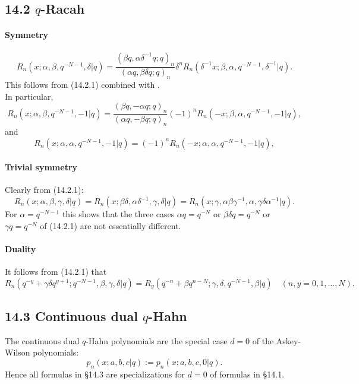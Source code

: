 \documentclass[twoside,11pt]{article}
\newcommand\sa{\smallskipamount}
\newcommand\sLP{\\[\sa]}
\newcommand\al\alpha
\newcommand\be\beta
\newcommand\ga\gamma
\newcommand\de\delta
\begin{document}
\subsection*{14.2 $q$-Racah}
\label{sec14.2}
\paragraph{Symmetry}
\begin{equation}
R_n(x;\al,\be,q^{-N-1},\de |  q)
=\frac{(\be q,\al\de^{-1}q;q)_n}{(\al q,\be\de q;q)_n} \de^n 
R_n(\de^{-1}x;\be,\al,q^{-N-1},\de^{-1} |  q).
\label{84}
\end{equation}
This follows from (14.2.1) combined with .
\sLP
In particular,
\begin{equation}
R_n(x;\al,\be,q^{-N-1},-1 |  q)
=\frac{(\be q,-\al q;q)_n}{(\al q,-\be q;q)_n} (-1)^n 
R_n(-x;\be,\al,q^{-N-1},-1 |  q),
\label{85}
\end{equation}
and
\begin{equation}
R_n(x;\al,\al,q^{-N-1},-1 |  q)
=(-1)^n R_n(-x;\al,\al,q^{-N-1},-1 |  q),
\label{86}
\end{equation}

\paragraph{Trivial symmetry}
Clearly from (14.2.1):
\begin{equation}
R_n(x;\al,\be,\ga,\de |  q)=R_n(x;\be\de,\al\de^{-1},\ga,\de |  q)
=R_n(x;\ga,\al\be\ga^{-1},\al,\ga\de\al^{-1} |  q).
\label{83}
\end{equation}
For $\al=q^{-N-1}$ this shows that the three cases
$\al q=q^{-N}$ or $\be\de q=q^{-N}$ or $\ga q=q^{-N}$ of (14.2.1)
are not essentially different.
%
\paragraph{Duality}
It follows from (14.2.1) that
\begin{equation}
R_n(q^{-y}+\ga\de q^{y+1};q^{-N-1},\be,\ga,\de |  q)
=R_y(q^{-n}+\be q^{n-N};\ga,\de,q^{-N-1},\be |  q)\quad
(n,y=0,1,\ldots,N).
\end{equation}
%
\subsection*{14.3 Continuous dual $q$-Hahn}
\label{sec14.3}
The continuous dual $q$-Hahn polynomials are the special case $d=0$ of the
Askey-Wilson polynomials:
\[
p_n(x;a,b,c |  q):=p_n(x;a,b,c,0 |  q).
\]
Hence all formulas in \S14.3 are specializations for $d=0$ of formulas in \S14.1.
%
\end{document}
